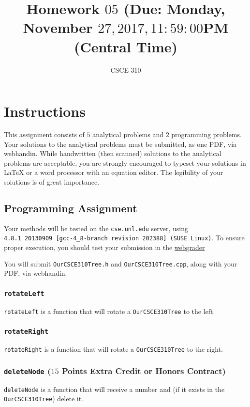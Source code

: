 \documentclass[addpoints,letter,11pt]{exam}
\title{Homework $05$ (Due: Monday, November $27, 2017, 11:59:00$PM (Central Time)}
\author{CSCE $310$}
\date{}
\begin{document}
\maketitle

\section*{Instructions}
This assignment consists of $5$ analytical problems and $2$ programming problems. Your solutions to the analytical problems must be submitted, as one PDF, via webhandin. While handwritten (then scanned) solutions to the analytical problems are acceptable, you are strongly encouraged to typeset your solutions in \LaTeX{} or a word processor with an equation editor. The legibility of your solutions is of great importance.

\subsection*{Programming Assignment}
Your methods will be tested on the \verb+cse.unl.edu+ server, using\\
\verb!4.8.1 20130909 [gcc-4_8-branch revision 202388] (SUSE Linux)!. To ensure proper execution, you should test your submission in the \href{http://cse.unl.edu/~cse310/grade}{\color{unlred}webgrader}

You will submit \verb+OurCSCE310Tree.h+ and \verb+OurCSCE310Tree.cpp+, along with your PDF, via webhandin.

\subsubsection*{\texttt{rotateLeft}}
\verb+rotateLeft+ is a function that will rotate a \verb+OurCSCE310Tree+ to the left.

\subsubsection*{\texttt{rotateRight}}
\verb+rotateRight+ is a function that will rotate a \verb+OurCSCE310Tree+ to the right.

\subsubsection*{\texttt{deleteNode} ($15$ Points Extra Credit or Honors Contract)}
\verb+deleteNode+ is a function that will receive a number and (if it exists in the \verb+OurCSCE310Tree+) delete it.
\end{document}
